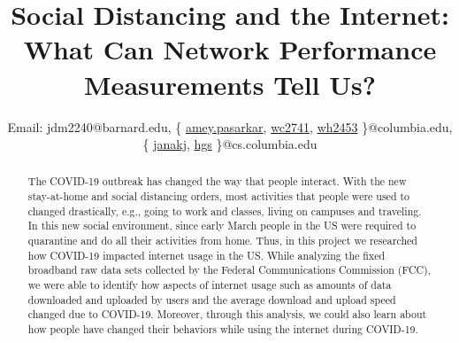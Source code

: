 \documentclass[conference,10pt]{IEEEtran}
\begin{document}
\title{Social Distancing and the Internet: What Can Network Performance Measurements Tell Us?}

\author{
    Email:
    jdm2240@barnard.edu,
    \{%
      \href{mailto:amey.pasarkar@columbia.edu}{\color{black}amey.pasarkar},%
      \href{mailto:wc2741@columbia.edu}{\color{black}wc2741},%
      \href{mailto:wh2453@columbia.edu}{\color{black}wh2453}%
    \}@columbia.edu,
    \{%
      \href{mailto:janakj@cs.columbia.edu}{\color{black}janakj},%
      \href{mailto:hgs@cs.columbia.edu}{\color{black}hgs}%
    \}@cs.columbia.edu
}

\maketitle

\begin{abstract}
The COVID-19 outbreak has changed the way that people interact. With the new stay-at-home and social distancing orders, most activities that people were used to changed drastically, e.g., going to work and classes, living on campuses and traveling. In this new social environment, since early March people in the US were required to quarantine and do all their activities from home. Thus, in this project we researched how COVID-19 impacted internet usage in the US. While analyzing the fixed broadband raw data sets collected by the Federal Communications Commission (FCC), we were able to identify how aspects of internet usage such as amounts of data downloaded and uploaded by users and the average download and upload speed changed due to COVID-19. Moreover, through this analysis, we could also learn about how people have changed their behaviors while using the internet during COVID-19.
\end{abstract}
\end{document}
